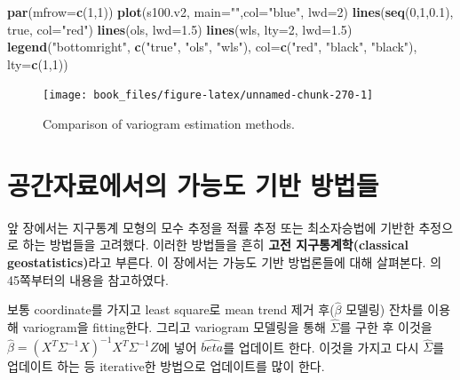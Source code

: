 \documentclass[b5paper,]{scrbook}
\makeatletter
\newenvironment{Shaded}{\begin{snugshade}}{\end{snugshade}}
\newcommand{\KeywordTok}[1]{\textcolor[rgb]{0.13,0.29,0.53}{\textbf{#1}}}
\newcommand{\DataTypeTok}[1]{\textcolor[rgb]{0.13,0.29,0.53}{#1}}
\newcommand{\DecValTok}[1]{\textcolor[rgb]{0.00,0.00,0.81}{#1}}
\newcommand{\FloatTok}[1]{\textcolor[rgb]{0.00,0.00,0.81}{#1}}
\newcommand{\StringTok}[1]{\textcolor[rgb]{0.31,0.60,0.02}{#1}}
\newcommand{\NormalTok}[1]{#1}
\theoremstyle{plain}
\theoremstyle{definition}
\numberwithin{equation}{section}
\newenvironment{kframe}{%
\medskip{}
\setlength{\fboxsep}{.8em}
 \def\at@end@of@kframe{}%
 \ifinner\ifhmode%
  \def\at@end@of@kframe{\end{minipage}}%
  \begin{minipage}{\columnwidth}%
 \fi\fi%
 \def\FrameCommand##1{\hskip\@totalleftmargin \hskip-\fboxsep
 \colorbox{shadecolor}{##1}\hskip-\fboxsep
     \hskip-\linewidth \hskip-\@totalleftmargin \hskip\columnwidth}%
 \MakeFramed {\advance\hsize-\width
   \@totalleftmargin\z@ \linewidth\hsize
   \@setminipage}}%
 {\par\unskip\endMakeFramed%
 \at@end@of@kframe}
\renewenvironment{Shaded}{\begin{kframe}}{\end{kframe}}
\makeatother
\begin{document}
\begin{Shaded}
\begin{Highlighting}[]
\KeywordTok{par}\NormalTok{(}\DataTypeTok{mfrow=}\KeywordTok{c}\NormalTok{(}\DecValTok{1}\NormalTok{,}\DecValTok{1}\NormalTok{))}
\KeywordTok{plot}\NormalTok{(s100.v2, }\DataTypeTok{main=}\StringTok{""}\NormalTok{,}\DataTypeTok{col=}\StringTok{"blue"}\NormalTok{, }\DataTypeTok{lwd=}\DecValTok{2}\NormalTok{)}
\KeywordTok{lines}\NormalTok{(}\KeywordTok{seq}\NormalTok{(}\DecValTok{0}\NormalTok{,}\DecValTok{1}\NormalTok{,}\FloatTok{0.1}\NormalTok{), true, }\DataTypeTok{col=}\StringTok{"red"}\NormalTok{)}
\KeywordTok{lines}\NormalTok{(ols, }\DataTypeTok{lwd=}\FloatTok{1.5}\NormalTok{)}
\KeywordTok{lines}\NormalTok{(wls, }\DataTypeTok{lty=}\DecValTok{2}\NormalTok{, }\DataTypeTok{lwd=}\FloatTok{1.5}\NormalTok{)}
\KeywordTok{legend}\NormalTok{(}\StringTok{"bottomright"}\NormalTok{, }\KeywordTok{c}\NormalTok{(}\StringTok{"true"}\NormalTok{, }\StringTok{"ols"}\NormalTok{, }\StringTok{"wls"}\NormalTok{),}
       \DataTypeTok{col=}\KeywordTok{c}\NormalTok{(}\StringTok{"red"}\NormalTok{, }\StringTok{"black"}\NormalTok{, }\StringTok{"black"}\NormalTok{), }\DataTypeTok{lty=}\KeywordTok{c}\NormalTok{(}\DecValTok{1}\NormalTok{,}\DecValTok{1}\NormalTok{))}
\end{Highlighting}
\end{Shaded}

\begin{figure}

{\centering \texttt{[image: book\_files/figure-latex/unnamed-chunk-270-1]} 

}

\caption{Comparison of variogram estimation methods.}\label{fig:unnamed-chunk-270}
\end{figure}

\chapter{공간자료에서의 가능도 기반 방법들}\label{spatlikelihood}

앞 장에서는 지구통계 모형의 모수 추정을 적률 추정 또는 최소자승법에
기반한 추정으로 하는 방법들을 고려했다. 이러한 방법들을 흔히
\textbf{고전 지구통계학(classical geostatistics)}라고 부른다. 이
장에서는 가능도 기반 방법론들에 대해 살펴본다. \citep{Gelfand2010}의
45쪽부터의 내용을 참고하였다.

보통 coordinate를 가지고 least square로 mean trend 제거
후(\(\hat{\beta}\) 모델링) 잔차를 이용해 variogram을 fitting한다. 그리고
variogram 모델링을 통해 \(\hat{\Sigma}\)를 구한 후 이것을
\(\hat{\beta}=(X^{T}\Sigma^{-1}X)^{-1}X^{T}\Sigma^{-1}Z\)에 넣어
\(\hat{beta}\)를 업데이트 한다. 이것을 가지고 다시 \(\hat{\Sigma}\)를
업데이트 하는 등 iterative한 방법으로 업데이트를 많이 한다.
\end{document}
